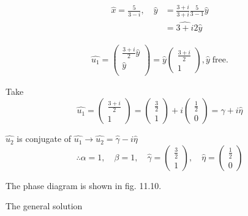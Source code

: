 \documentclass[12pt,twoside]{article}
\begin{document}
\begin{equation}
  \begin{aligned}
    \hat{x} = \frac{5}{3-i},\quad \hat{y}&=\frac{3+i}{3+i}\frac{5}{3-1}\hat{y} \\
    &=\hat{3+i}{2}\hat{y}
  \end{aligned}
\end{equation}

\begin{equation}
  \begin{aligned}
    \hat{u_1} =
    \begin{pmatrix}
      \frac{3+i}{2}\hat{y} \\
      \hat{y} \\
    \end{pmatrix} =
    \hat{y}
    \begin{pmatrix}
      \frac{3+i}{2} \\ 1
    \end{pmatrix}, \hat{y}\;\text{free}.
  \end{aligned}
\end{equation}

Take
\begin{equation}
  \hat{u_1} =
  \begin{pmatrix}
    \frac{3+i}{2} \\ 1
  \end{pmatrix} =
  \begin{pmatrix}
    \frac{3}{2} \\ 1
  \end{pmatrix} +
  i\begin{pmatrix}
    \frac{1}{2} \\ 0
  \end{pmatrix} =
  \hat{\gamma} + i\hat{\eta}
\end{equation}

$\hat{u_2}$ is conjugate of
$\hat{u_1}\rightarrow\hat{u_2}=\hat{\gamma}-i\hat{\eta}$
$$\therefore \alpha=1,\quad \beta=1,\quad \hat{\gamma}=
\begin{pmatrix}
  \frac{3}{2} \\ 1
\end{pmatrix},\quad \hat{\eta} =
\begin{pmatrix}
  \frac{1}{2} \\ 0
\end{pmatrix}
$$

The phase diagram is shown in fig. 11.10.

The general solution
\end{document}

